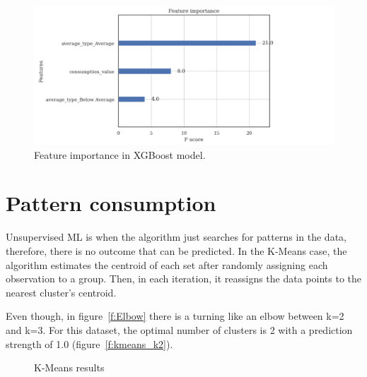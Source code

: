 \documentclass[a4paper,12pt,twoside]{ThesisStyle}
\begin{document}
\begin{figure}[hbt]
\centering
\includegraphics[width=13 cm]{imatges/feature_importance_xgboost.png}
\caption{\label{fig:feature_importance_xgboost} Feature importance in XGBoost model.}
\end{figure}

\section{Pattern consumption}

Unsupervised ML is when the algorithm just searches for patterns in the data, therefore, there is no outcome that can be predicted. In the K-Means case, the algorithm estimates the centroid of each set after randomly assigning each observation to a group. Then, in each iteration, it reassigns the data points to the nearest cluster's centroid.

Even though, in figure~\ref{f:Elbow} there is a turning like an elbow between k=2 and k=3.  For this dataset, the optimal number of clusters is 2 with a prediction strength of 1.0 (figure~\ref{f:kmeans_k2}).

\begin{figure}
 \centering
 \caption{K-Means results}
 \label{f:KMeansresults}
\end{figure}
\end{document}
